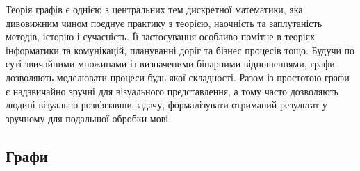 Теорія графів є однією з центральних тем дискретної математики, яка дивовижним чином поєднує практику з теорією, наочність та заплутаність методів, історію і сучасність. Її застосування особливо помітне в теоріях інформатики та комунікацій, плануванні доріг та бізнес процесів тощо. Будучи по суті звичайними множинами із визначеними бінарними відношеннями, графи дозволяють моделювати процеси будь-якої складності. Разом із простотою графи є надзвичайно зручні для візуального представлення, а тому часто дозволяють людині візуально розв'язавши задачу, формалізувати отриманий результат у зручному для подальшої обробки мові.
\newpage
\subsection{Графи}

